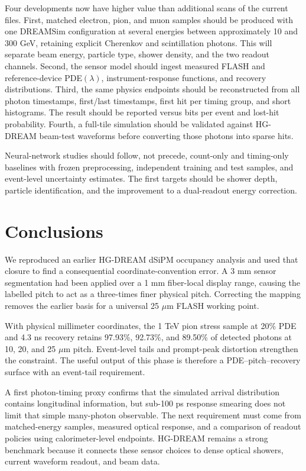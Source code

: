 \documentclass[a4paper,11pt]{article}
\begin{document}
Four developments now have higher value than additional scans of the current
files. First, matched electron, pion, and muon samples should be produced with
one DREAMSim configuration at several energies between approximately 10 and
300 GeV, retaining explicit Cherenkov and scintillation photons. This will
separate beam energy, particle type, shower density, and the two readout
channels.
Second, the sensor model should ingest measured FLASH and reference-device
PDE$(\lambda)$, instrument-response functions, and recovery distributions.
Third, the same physics endpoints should be reconstructed from all photon
timestamps, first/last timestamps, first hit per timing group, and short
histograms. The result should be reported versus bits per event and lost-hit
probability. Fourth, a full-tile simulation should be validated against
HG-DREAM beam-test waveforms before converting those photons into sparse hits.

Neural-network studies should follow, not precede, count-only and timing-only
baselines with frozen preprocessing, independent training and test samples,
and event-level uncertainty estimates. The first targets should be shower
depth, particle identification, and the improvement to a dual-readout energy
correction.

\section{Conclusions}
\label{sec:conclusions}

We reproduced an earlier HG-DREAM dSiPM occupancy analysis and used that
closure to find a consequential coordinate-convention error. A 3 mm sensor
segmentation had been applied over a 1 mm fiber-local display range, causing
the labelled pitch to act as a three-times finer physical pitch. Correcting
the mapping removes the earlier basis for a universal 25 $\mu$m FLASH working
point.

With physical millimeter coordinates, the 1 TeV pion stress sample at 20\%
PDE and 4.3 ns recovery retains 97.93\%, 92.73\%, and 89.50\% of detected
photons at 10, 20, and 25 $\mu$m pitch. Event-level tails and prompt-peak
distortion strengthen the constraint. The useful output of this phase is
therefore a PDE--pitch--recovery surface with an event-tail requirement.

A first photon-timing proxy confirms that the simulated arrival distribution
contains longitudinal information, but sub-100 ps response smearing does not
limit that simple many-photon observable. The next requirement must come from
matched-energy samples, measured optical response, and a comparison of
readout policies using calorimeter-level endpoints. HG-DREAM remains a strong
benchmark because it connects these sensor choices to dense optical showers,
current waveform readout, and beam data.
\end{document}
